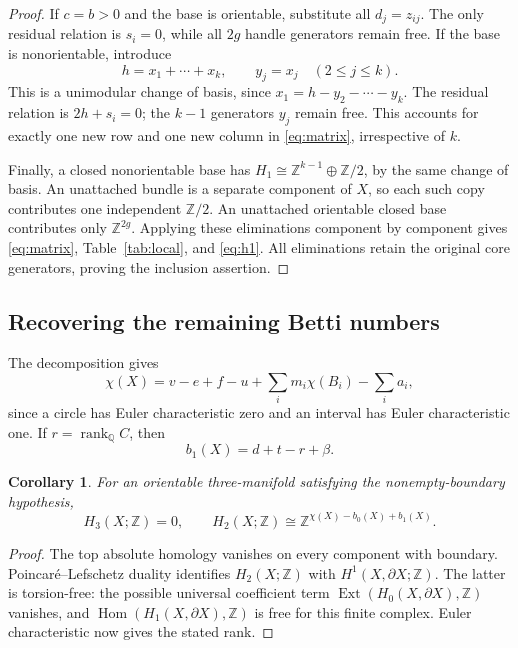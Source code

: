 \documentclass[11pt]{article}
\newtheorem{corollary}[theorem]{Corollary}
\theoremstyle{definition}
\theoremstyle{remark}
\newcommand{\Z}{\mathbb Z}
\newcommand{\Q}{\mathbb Q}
\newcommand{\rank}{\operatorname{rank}}
\begin{document}
\begin{proof}
If $c=b>0$ and the base is orientable, substitute all $d_j=z_{ij}$.
The only residual relation is $s_i=0$, while all $2g$ handle generators
remain free. If the base is nonorientable, introduce
\[
 h=x_1+\cdots+x_k,\qquad y_j=x_j\quad(2\leq j\leq k).
\]
This is a unimodular change of basis, since
$x_1=h-y_2-\cdots-y_k$. The residual relation is $2h+s_i=0$; the $k-1$
generators $y_j$ remain free. This accounts for exactly one new row and one
new column in \eqref{eq:matrix}, irrespective of $k$.

Finally, a closed nonorientable base has
$H_1\cong\Z^{k-1}\oplus\Z/2$, by the same change of basis. An unattached
bundle is a separate component of $X$, so each such copy contributes one
independent $\Z/2$. An unattached orientable closed base contributes only
$\Z^{2g}$. Applying these eliminations component by component gives
\eqref{eq:matrix}, Table~\ref{tab:local}, and \eqref{eq:h1}. All eliminations
retain the original core generators, proving the inclusion assertion.
\end{proof}

\subsection{Recovering the remaining Betti numbers}
The decomposition gives
\begin{equation}
 \chi(X)=v-e+f-u+\sum_i m_i\chi(B_i)-\sum_i a_i,
 \label{eq:euler}
\end{equation}
since a circle has Euler characteristic zero and an interval has Euler
characteristic one. If $r=\rank_\Q C$, then
\begin{equation}
 b_1(X)=d+t-r+\beta.
 \label{eq:b1}
\end{equation}

\begin{corollary}
\label{cor:h2}
For an orientable three-manifold satisfying the nonempty-boundary hypothesis,
\[
 H_3(X;\Z)=0,\qquad
 H_2(X;\Z)\cong\Z^{\chi(X)-b_0(X)+b_1(X)}.
\]
\end{corollary}
\begin{proof}
The top absolute homology vanishes on every component with boundary.
Poincar\'e--Lefschetz duality identifies $H_2(X;\Z)$ with
$H^1(X,\partial X;\Z)$. The latter is torsion-free: the possible universal
coefficient term $\operatorname{Ext}(H_0(X,\partial X),\Z)$ vanishes, and
$\operatorname{Hom}(H_1(X,\partial X),\Z)$ is free for this finite complex.
Euler characteristic now gives the stated rank.
\end{proof}
\end{document}
